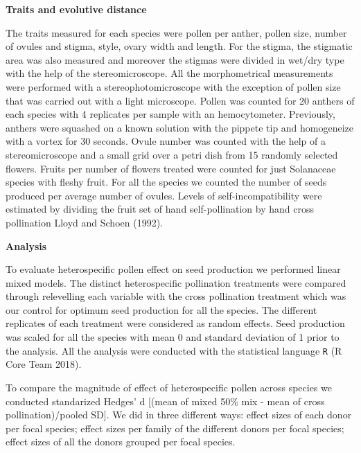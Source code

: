 \documentclass[11pt,a4paper]{article}
\begin{document}
\textbf{Traits and evolutive distance}

The traits measured for each species were pollen per anther, pollen
size, number of ovules and stigma, style, ovary width and length. For
the stigma, the stigmatic area was also measured and moreover the
stigmas were divided in wet/dry type with the help of the
stereomicroscope. All the morphometrical measurements were performed
with a stereophotomicroscope with the exception of pollen size that was
carried out with a light microscope. Pollen was counted for 20 anthers
of each species with 4 replicates per sample with an hemocytometer.
Previously, anthers were squashed on a known solution with the pippete
tip and homogeneize with a vortex for 30 seconds. Ovule number was
counted with the help of a stereomicroscope and a small grid over a
petri dish from 15 randomly selected flowers. Fruits per number of
flowers treated were counted for just Solanaceae species with fleshy
fruit. For all the species we counted the number of seeds produced per
average number of ovules. Levels of self-incompatibility were estimated
by dividing the fruit set of hand self-pollination by hand cross
pollination Lloyd and Schoen (1992).

\textbf{Analysis}

To evaluate heterospecific pollen effect on seed production we performed
linear mixed models. The distinct heterospecific pollination treatments
were compared through relevelling each variable with the cross
pollination treatment which was our control for optimum seed production
for all the species. The different replicates of each treatment were
considered as random effects. Seed production was scaled for all the
species with mean 0 and standard deviation of 1 prior to the analysis.
All the analysis were conducted with the statistical language \texttt{R}
(R Core Team 2018).

To compare the magnitude of effect of heterospecific pollen across
species we conducted standarized Hedges' d {[}(mean of mixed 50\% mix -
mean of cross pollination)/pooled SD{]}. We did in three different ways:
effect sizes of each donor per focal species; effect sizes per family of
the different donors per focal species; effect sizes of all the donors
grouped per focal species.
\end{document}
